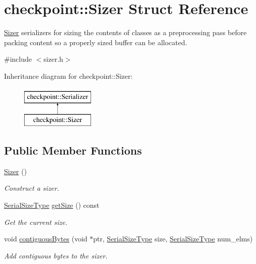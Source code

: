 \hypertarget{structcheckpoint_1_1_sizer}{}\section{checkpoint\+:\+:Sizer Struct Reference}
\label{structcheckpoint_1_1_sizer}


\hyperlink{structcheckpoint_1_1_sizer}{Sizer} serializers for sizing the contents of classes as a preprocessing pass before packing content so a properly sized buffer can be allocated.  




{\ttfamily \#include $<$sizer.\+h$>$}

Inheritance diagram for checkpoint\+:\+:Sizer\+:\begin{figure}[H]
\begin{center}
\leavevmode
\includegraphics[height=2.000000cm]{structcheckpoint_1_1_sizer}
\end{center}
\end{figure}
\subsection*{Public Member Functions}
\begin{DoxyCompactItemize}
\item 
\hyperlink{structcheckpoint_1_1_sizer_a17995329af9eec00859e86c6fabf4890}{Sizer} ()
\begin{DoxyCompactList}\small\item\em Construct a sizer. \end{DoxyCompactList}\item 
\hyperlink{namespacecheckpoint_a083f6674da3f94c2901b18c6d238217c}{Serial\+Size\+Type} \hyperlink{structcheckpoint_1_1_sizer_a9cabfd6cafb49a79b645663c41e4c74a}{get\+Size} () const
\begin{DoxyCompactList}\small\item\em Get the current size. \end{DoxyCompactList}\item 
void \hyperlink{structcheckpoint_1_1_sizer_a1141bde0fae75fd8be9ad5187876594d}{contiguous\+Bytes} (void $\ast$ptr, \hyperlink{namespacecheckpoint_a083f6674da3f94c2901b18c6d238217c}{Serial\+Size\+Type} size, \hyperlink{namespacecheckpoint_a083f6674da3f94c2901b18c6d238217c}{Serial\+Size\+Type} num\+\_\+elms)
\begin{DoxyCompactList}\small\item\em Add contiguous bytes to the sizer. \end{DoxyCompactList}\end{DoxyCompactItemize}
